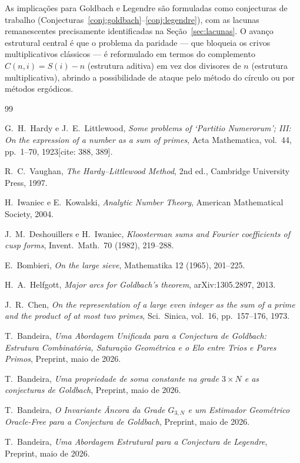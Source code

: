 \documentclass[12pt]{article}
\theoremstyle{definition}
\theoremstyle{remark}
\begin{document}
	As implicações para Goldbach e Legendre são formuladas como conjecturas
	de trabalho (Conjecturas~\ref{conj:goldbach}--\ref{conj:legendre}),
	com as lacunas remanescentes precisamente identificadas na Seção~\ref{sec:lacunas}.
	O avanço estrutural central é que o problema da paridade — que bloqueia
	os crivos multiplicativos clássicos — é reformulado em termos do
	complemento $C(n,i)=S(i)-n$ (estrutura aditiva) em vez dos divisores de
	$n$ (estrutura multiplicativa), abrindo a possibilidade de ataque pelo
	método do círculo ou por métodos ergódicos.
	
	\begin{thebibliography}{99}
		
		G.~H.~Hardy e J.~E.~Littlewood,
		\emph{Some problems of `Partitio Numerorum'; III: On the expression of a number as a sum of primes},
		Acta Mathematica, vol.~44, pp.~1--70, 1923[cite: 388, 389].
		
		R.~C.~Vaughan,
		\emph{The Hardy–Littlewood Method},
		2nd ed., Cambridge University Press, 1997.
		
		H.~Iwaniec e E.~Kowalski,
		\emph{Analytic Number Theory},
		American Mathematical Society, 2004.
		
		J.~M.~Deshouillers e H.~Iwaniec,
		\emph{Kloosterman sums and Fourier coefficients of cusp forms},
		Invent.\ Math.\ 70 (1982), 219--288.
		
		E.~Bombieri,
		\emph{On the large sieve},
		Mathematika 12 (1965), 201--225.
		
		H.~A.~Helfgott,
		\emph{Major arcs for Goldbach's theorem},
		arXiv:1305.2897, 2013.
		
		J.~R.~Chen,
		\emph{On the representation of a large even integer as the sum of a prime
			and the product of at most two primes},
		Sci.\ Sinica, vol.~16, pp.~157--176, 1973.
		
		T.~Bandeira,
		\emph{Uma Abordagem Unificada para a Conjectura de Goldbach:
			Estrutura Combinatória, Saturação Geométrica e o Elo entre Trios e
			Pares Primos},
		Preprint, maio de 2026.
		
		T.~Bandeira,
		\emph{Uma propriedade de soma constante na grade $3\times N$ e as
			conjecturas de Goldbach},
		Preprint, maio de 2026.
		
		T.~Bandeira,
		\emph{O Invariante Âncora da Grade $G_{3,N}$ e um Estimador Geométrico
			Oracle-Free para a Conjectura de Goldbach},
		Preprint, maio de 2026.
		
		T.~Bandeira,
		\emph{Uma Abordagem Estrutural para a Conjectura de Legendre},
		Preprint, maio de 2026.
		
	\end{thebibliography}
	
\end{document}
